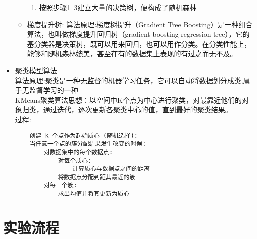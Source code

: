 \documentclass{hitreport}
\begin{document}
\begin{itemize}
\begin{itemize}
\begin{enumerate}
                  \item 按照步骤1~3建立大量的决策树，便构成了随机森林
                \end{enumerate}
          \item 梯度提升树:
                算法原理:梯度树提升（Gradient Tree Boosting）是一种组合算法，也叫做梯度提升回归树（gradient boosting regression tree），它的基分类器是决策树，既可以用来回归，也可以用作分类。在分类性能上，能够和随机森林媲美，甚至在有的数据集上表现的有过之而无不及。
        \end{itemize}
  \item 聚类模型算法\\
        算法原理:聚类是一种无监督的机器学习任务，它可以自动将数据划分成类,属于无监督学习的一种\\
        KMeans聚类算法思想：以空间中K个点为中心进行聚类，对最靠近他们的对象归类，通过迭代，逐次更新各聚类中心的值，直到最好的聚类结果。\\
        过程:
        \begin{lstlisting}
    创建 k 个点作为起始质心 (随机选择):
    当任意一个点的簇分配结果发生改变的时候:
        对数据集中的每个数据点:
            对每个质心:
                计算质心与数据点之间的距离
            将数据点分配到距其最近的簇
        对每一个簇:
            求出均值并将其更新为质心
  \end{lstlisting}
\end{itemize}
\section{实验流程}
\end{document}
